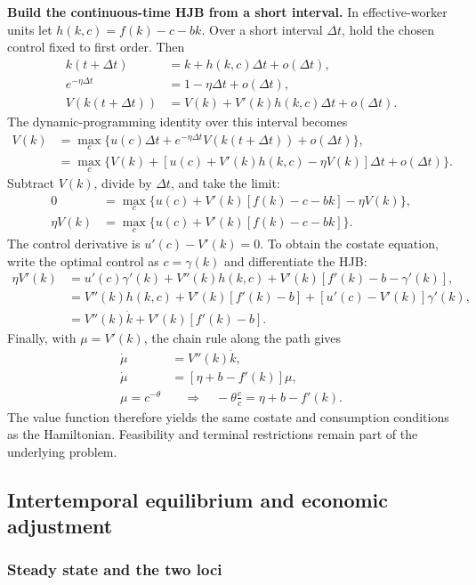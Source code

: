 \textbf{Build the continuous-time HJB from a short interval.}
In effective-worker units let $h(k,c)=f(k)-c-bk$. Over a short interval
$\Delta t$, hold the chosen control fixed to first order. Then
\begin{align}
k(t+\Delta t)&=k+h(k,c)\Delta t+o(\Delta t),\\
e^{-\eta\Delta t}&=1-\eta\Delta t+o(\Delta t),\\
V(k(t+\Delta t))&=V(k)+V'(k)h(k,c)\Delta t+o(\Delta t).
\end{align}
The dynamic-programming identity over this interval becomes
\begin{align}
V(k)&=\max_c\{u(c)\Delta t
              +e^{-\eta\Delta t}V(k(t+\Delta t))+o(\Delta t)\},\\
&=\max_c\{V(k)+[u(c)+V'(k)h(k,c)-\eta V(k)]\Delta t
                    +o(\Delta t)\}.
\end{align}
Subtract $V(k)$, divide by $\Delta t$, and take the limit:
\begin{align}
0&=\max_c\{u(c)+V'(k)[f(k)-c-bk]-\eta V(k)\},\\
\eta V(k)&=\max_c\{u(c)+V'(k)[f(k)-c-bk]\}.
\end{align}
The control derivative is $u'(c)-V'(k)=0$. To obtain the costate equation,
write the optimal control as $c=\gamma(k)$ and differentiate the HJB:
\begin{align}
\eta V'(k)
 &=u'(c)\gamma'(k)+V''(k)h(k,c)
    +V'(k)[f'(k)-b-\gamma'(k)],\\
 &=V''(k)h(k,c)+V'(k)[f'(k)-b]
    +[u'(c)-V'(k)]\gamma'(k),\\
 &=V''(k)\dot k+V'(k)[f'(k)-b].
\end{align}
Finally, with $\mu=V'(k)$, the chain rule along the path gives
\begin{align}
\dot\mu&=V''(k)\dot k,\\
\dot\mu&=[\eta+b-f'(k)]\mu,\\
\mu=c^{-\theta}
&\quad\Longrightarrow\quad
-\theta\frac{\dot c}{c}=\eta+b-f'(k).
\end{align}
The value function therefore yields the same costate and consumption
conditions as the Hamiltonian. Feasibility and terminal restrictions remain
part of the underlying problem.

\subsection{Intertemporal equilibrium and economic adjustment}

\subsubsection{Steady state and the two loci}

